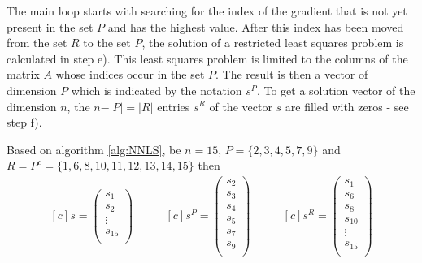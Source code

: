 The main loop starts with searching for the index of the gradient that is not yet present in the set $P$ and has the highest value. After this index has been moved from the set $R$ to the set $P$, the solution of a restricted least squares problem is calculated in step e). This least squares problem is limited to the columns of the matrix $A$ whose indices occur in the set $P$. The result is then a vector of dimension $P$ which is indicated by the notation $s^P$. To get a solution vector of the dimension $n$, the $n - \vert P \vert = \vert R \vert$ entries $s^R$ of the vector $s$ are filled with zeros - see step f). 

\begin{example}
	Based on algorithm \ref{alg:NNLS}, be $n = 15$, $P = \{2, 3, 4, 5, 7, 9\}$ and  $R = P^c = \{1, 6, 8, 10, 11, 12, 13, 14, 15\}$ then
	\begin{equation*}
		\begin{aligned}[c]	
		s = 
		\left( 
		\begin{array}{c}
		s_{1} \\
		s_{2} \\
		\vdots\\
		s_{15}\\
		\end{array}
		\right)	
		\end{aligned}
		\qquad
		\begin{aligned}[c]
		s^P = 
		\left( 
		\begin{array}{c}
		s_{2} \\
		s_{3} \\
		s_{4} \\
		s_{5} \\
		s_{7} \\
		s_{9} \\
		\end{array}
		\right)	
		\end{aligned}
		\qquad
		\begin{aligned}[c]
		s^R = 
		\left( 
		\begin{array}{c}
		s_{1} \\
		s_{6} \\
		s_{8} \\
		s_{10} \\
		\vdots \\
		s_{15} \\
		\end{array}
		\right)	
		\end{aligned}	
	\end{equation*}
\end{example}

